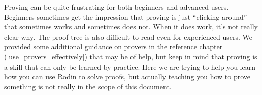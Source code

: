 Proving can be quite frustrating for both beginners and advanced users.  Beginners sometimes get the impression that proving is just ``clicking around'' that sometimes works and sometimes does not.  When it does work, it's not really clear why. The proof tree is also difficult to read even for experienced users.  We provided some additional guidance on provers in the reference chapter (\ref{use_provers_effectively}) that may be of help, but keep in mind that proving is a skill that can only be learned by practice. Here we are trying to help you learn how you can use Rodin to solve proofs, but actually teaching you how to prove something is not really in the scope of this document.


